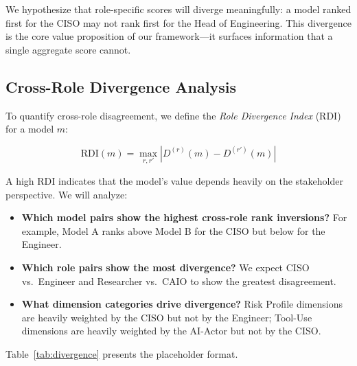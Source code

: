 \documentclass[10pt,twocolumn]{article}
\begin{document}
We hypothesize that role-specific scores will diverge meaningfully: a model ranked first for the CISO may not rank first for the Head of Engineering. This divergence is the core value proposition of our framework---it surfaces information that a single aggregate score cannot.

\subsection{Cross-Role Divergence Analysis}
\label{sec:divergence}

To quantify cross-role disagreement, we define the \emph{Role Divergence Index} (RDI) for a model $m$:

\begin{equation}
\text{RDI}(m) = \max_{r, r'} |D^{(r)}(m) - D^{(r')}(m)|
\label{eq:rdi}
\end{equation}

A high RDI indicates that the model's value depends heavily on the stakeholder perspective. We will analyze:

\begin{itemize}[noitemsep,topsep=2pt]
    \item \textbf{Which model pairs show the highest cross-role rank inversions?} For example, Model A ranks above Model B for the CISO but below for the Engineer.
    \item \textbf{Which role pairs show the most divergence?} We expect CISO vs.\ Engineer and Researcher vs.\ CAIO to show the greatest disagreement.
    \item \textbf{What dimension categories drive divergence?} Risk Profile dimensions are heavily weighted by the CISO but not by the Engineer; Tool-Use dimensions are heavily weighted by the AI-Actor but not by the CISO.
\end{itemize}

Table~\ref{tab:divergence} presents the placeholder format.
\end{document}
